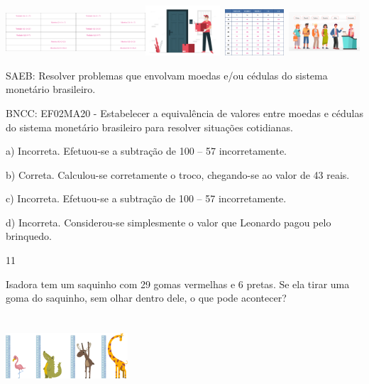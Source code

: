 \begin{escolha}
\begin{escolha}
{{{{\includegraphics[width=1.02736in,height=0.68704in]{media/image110.png}\includegraphics[width=1.02736in,height=0.68704in]{media/image110.png}\includegraphics[width=1.09268in,height=0.73073in]{media/image112.png}\includegraphics[width=1.01042in,height=0.67572in]{media/image111.png}\includegraphics[width=1.04264in,height=0.69727in]{media/image113.png}

SAEB: Resolver problemas que envolvam moedas e/ou cédulas do
sistema monetário brasileiro. 

BNCC: EF02MA20 - Estabelecer a
equivalência de valores entre moedas e cédulas do sistema monetário
brasileiro para resolver situações cotidianas.

a) Incorreta. Efetuou-se a subtração de 100 -- 57 incorretamente.

b) Correta. Calculou-se corretamente o troco, chegando-se ao valor de 43 reais.

c) Incorreta. Efetuou-se a subtração de 100 -- 57 incorretamente.

d) Incorreta. Considerou-se simplesmente o valor que Leonardo pagou pelo brinquedo.

\num{11}

Isadora tem um saquinho com 29 gomas vermelhas e 6 pretas. Se ela tirar
uma goma do saquinho, sem olhar dentro dele, o que pode acontecer?

\includegraphics[width=1.79687in,height=1.19792in]{media/image139.png}

}}}}
\end{escolha}
\end{escolha}
